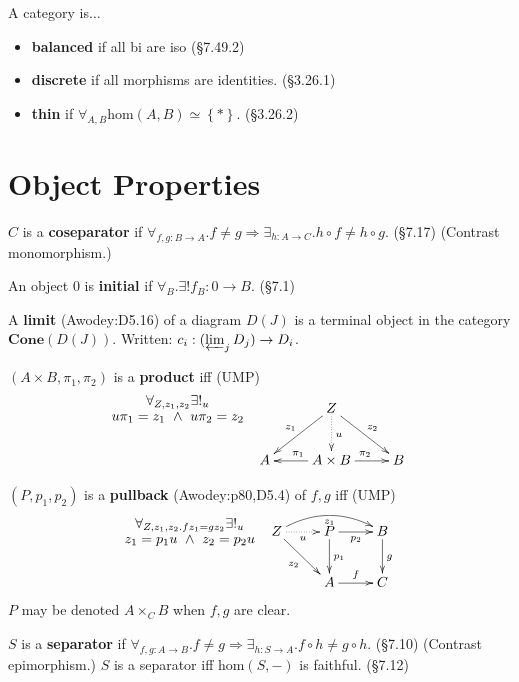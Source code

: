 \documentclass[10pt,twocolumn,letterpaper]{article}
\newcommand{\set}[1]{\left\{{#1}\right\}}
\newcommand{\defn}[1]{{\bf #1}}
\begin{document}
  A category is$\dots$
  \begin{itemize}
    \item \defn{balanced} if all bi are iso (\S7.49.2)
    \item \defn{discrete} if all morphisms are identities. (\S3.26.1)
    \item \defn{thin} if $\forall_{A,B} \mbox{hom}(A,B) \simeq \set{*}$. (\S3.26.2)
  \end{itemize}

\section{Object Properties}

  $C$ is a \defn{coseparator} if $\forall_{f,g : B \to A} . f \ne g
  \Rightarrow \exists_{h : A \to C} . h \circ f \ne h \circ g$. (\S7.17)
  (Contrast monomorphism.)

  An object $0$ is \defn{initial} if $\forall_B . \exists! f_B : 0 \to B$.
  (\S7.1)

  A \defn{limit} (Awodey:D5.16) of a diagram $D(J)$ is a
  terminal object in the category $\mathbf{Cone}(D(J))$.  Written:
  $c_i : (\varprojlim_{j} D_j) \to D_i$.

  $(A \times B,\pi_1,\pi_2)$ is a \defn{product} iff (UMP)
    \[\xymatrix{
    {}\save[]+<-1cm,0cm>*\txt<8pc>{$\forall_{Z,z_1,z_2} \exists!_u$\\$u\pi_1 = z_1 ~\wedge~ u\pi_2 = z_2$}\restore
    &      & Z \ar[dl]_{z_1} \ar[dr]^{z_2} \ar@{..>}[d]^u & \\
    &    A & \ar[l]_{\pi_1} A \times B \ar[r]^{\pi_2} & B \\
    }\]

  $(P,p_1,p_2)$ is a \defn{pullback} (Awodey:p80,D5.4) of $f,g$ iff (UMP)
     \[\xymatrix{
     {}\save[]+<-1cm,0cm>*\txt<8pc>{$\forall_{Z,z_1,z_2 . fz_1 = gz_2}\exists!_u$\\$z_1 = p_1u ~\wedge~ z_2 = p_2u$}\restore
     & Z \ar[dr]_{z_2} \ar@/^1pc/[rr]_{z_1} \ar@{..>}[r]_u & P \ar[d]^{p_1} \ar[r]_{p_2} & B \ar[d]^g \\
     &                                              & A \ar[r]^f & C
     }\]
     $P$ may be denoted $A \times_C B$ when $f,g$ are clear.

  $S$ is a \defn{separator} if $\forall_{f,g : A \to B} . f \ne g
  \Rightarrow \exists_{h : S \to A} . f \circ h \ne g \circ h$. (\S7.10)
  (Contrast epimorphism.)
  $S$ is a separator iff $\mbox{hom}(S,-)$ is faithful. (\S7.12)
\end{document}
